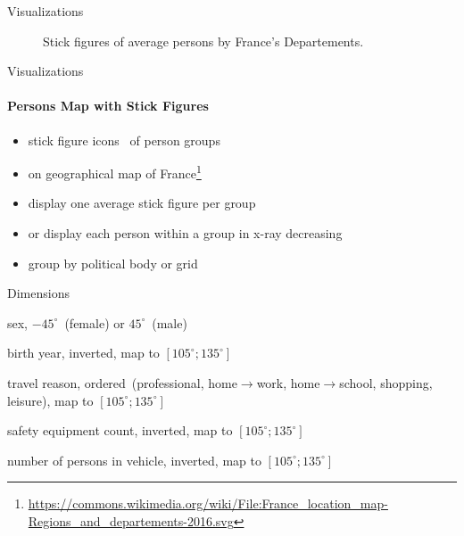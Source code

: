 \documentclass[english]{mlutalk}
\begin{document}
\begin{frame}{Visualizations}
\begin{minipage}{0.49\linewidth}
\begin{figure}
      \caption{Stick figures of average persons by France's Departements.}
    \end{figure}
  \end{minipage}
\end{frame}

\begin{frame}{Visualizations}
  \framesubtitle{Persons Map with Stick Figures}
  \begin{itemize}
    \item stick figure icons~\cite{PickettG1988} of person groups
    \item on geographical map of France\footnote{\tiny\url{https://commons.wikimedia.org/wiki/File:France_location_map-Regions_and_departements-2016.svg}}
    \item display one average stick figure per group
    \item or display each person within a group in x-ray decreasing
    \item group by political body or grid
  \end{itemize}

  \begin{block}{Dimensions}
    \scriptsize
    \begin{description}
      \setlength{\itemsep}{1pt}
      \item[\(\alpha\)] sex, \(-45^\circ\)~(female) or \(45^\circ\)~(male)
      \item[\(\beta\)] birth year, inverted, map to  \([105^\circ; 135^\circ]\)
      \item[\(\gamma\)] travel reason, ordered~(professional, home\(\to\)work, home\(\to\)school, shopping, leisure), map to  \([105^\circ; 135^\circ]\)
      \item[\(\delta\)] safety equipment count, inverted, map to  \([105^\circ; 135^\circ]\)
      \item[\(\epsilon\)] number of persons in vehicle, inverted, map to  \([105^\circ; 135^\circ]\)
    \end{description}
  \end{block}
\end{frame}
\end{document}
